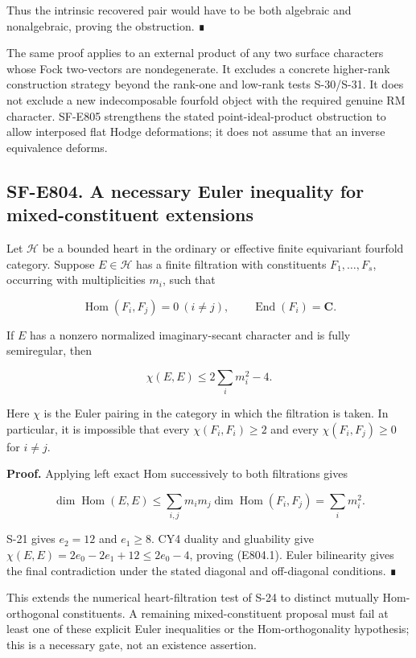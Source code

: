 Thus the intrinsic recovered pair would have to be both algebraic and
nonalgebraic, proving the obstruction. ∎

The same proof applies to an external product of any two surface
characters whose Fock two-vectors are nondegenerate. It excludes a
concrete higher-rank construction strategy beyond the rank-one and
low-rank tests S-30/S-31. It does not exclude a new indecomposable
fourfold object with the required genuine RM character. SF-E805
strengthens the stated point-ideal-product obstruction to allow
interposed flat Hodge deformations; it does not assume that an inverse
equivalence deforms.

\subsection{SF-E804. A necessary Euler inequality for mixed-constituent
extensions}\label{SF-E804}

Let \(\mathcal H\) be a bounded heart in the ordinary or effective
finite equivariant fourfold category. Suppose \(E\in\mathcal H\) has a
finite filtration with constituents \(F_1,\ldots,F_s\), occurring with
multiplicities \(m_i\), such that

\[
 \operatorname{Hom}(F_i,F_j)=0\ (i\ne j),
 \qquad\operatorname{End}(F_i)=\mathbf C.
\]

If \(E\) has a nonzero normalized imaginary-secant character and is
fully semiregular, then

\[
 \chi(E,E)\le2\sum_i m_i^2-4.
 \tag{E804.1}
\]

Here \(\chi\) is the Euler pairing in the category in which the
filtration is taken. In particular, it is impossible that every
\(\chi(F_i,F_i)\ge2\) and every \(\chi(F_i,F_j)\ge0\) for \(i\ne j\).

\textbf{Proof.} Applying left exact Hom successively to both filtrations
gives

\[
 \dim\operatorname{Hom}(E,E)
       \le\sum_{i,j}m_im_j\dim\operatorname{Hom}(F_i,F_j)
       =\sum_i m_i^2.
\]

S-21 gives \(e_2=12\) and \(e_1\ge8\). CY4 duality and gluability give
\(\chi(E,E)=2e_0-2e_1+12\le2e_0-4\), proving (E804.1). Euler bilinearity
gives the final contradiction under the stated diagonal and off-diagonal
conditions. ∎

This extends the numerical heart-filtration test of S-24 to distinct
mutually Hom-orthogonal constituents. A remaining mixed-constituent
proposal must fail at least one of these explicit Euler inequalities or
the Hom-orthogonality hypothesis; this is a necessary gate, not an
existence assertion.


